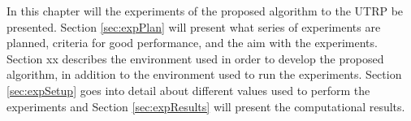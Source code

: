 In this chapter will the experiments of the proposed algorithm to the UTRP be presented. Section \vref{sec:expPlan} will present what series of experiments are planned, criteria for good performance, and the aim with the experiments. Section xx describes the environment used in order to develop the proposed algorithm, in addition to the environment used to run the experiments. Section \vref{sec:expSetup} goes into detail about different values used to perform the experiments and Section \vref{sec:expResults} will present the computational results. 

 

